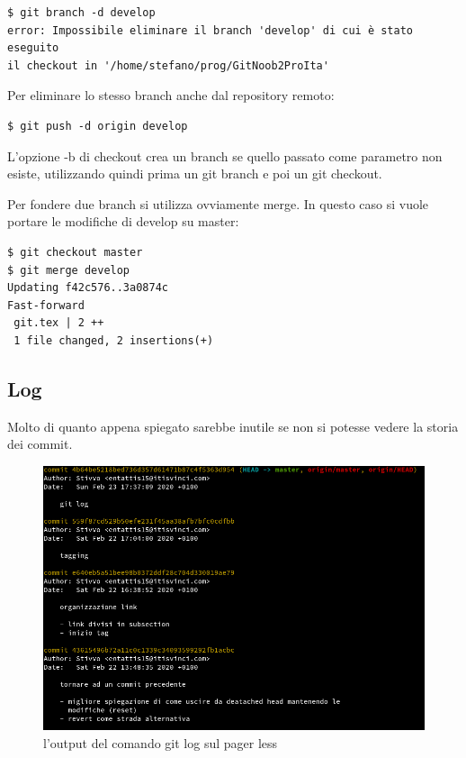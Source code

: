 \documentclass{article}
\begin{document}
\begin{verbatim}
$ git branch -d develop
error: Impossibile eliminare il branch 'develop' di cui è stato eseguito 
il checkout in '/home/stefano/prog/GitNoob2ProIta'
\end{verbatim}

Per eliminare lo stesso branch anche dal repository remoto:

\begin{verbatim}
$ git push -d origin develop
\end{verbatim}

L'opzione -b di checkout crea un branch se quello passato come parametro non
esiste, utilizzando quindi prima un git branch e poi un git checkout.

Per fondere due branch si utilizza ovviamente merge. In questo caso si vuole
portare le modifiche di develop su master:

\begin{verbatim}
$ git checkout master
$ git merge develop
Updating f42c576..3a0874c
Fast-forward
 git.tex | 2 ++
 1 file changed, 2 insertions(+)
\end{verbatim}

\subsection{Log\label{log}}
Molto di quanto appena spiegato sarebbe inutile se non si potesse vedere la
storia dei commit.

\begin{figure}
\includegraphics[width=6in]{img/logOutput.png}
\centering
\caption{l'output del comando git log sul pager less}
\end{figure}
\end{document}
